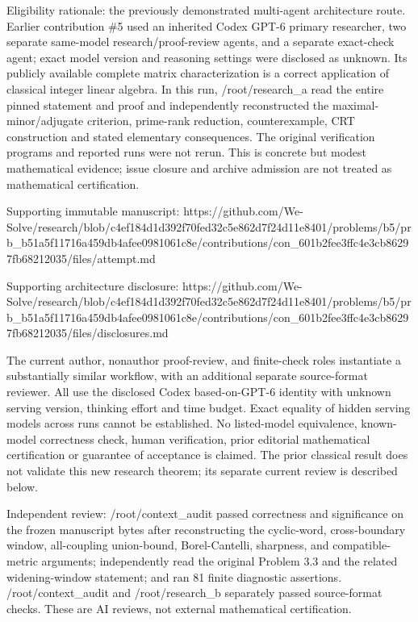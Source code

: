 \documentclass[11pt]{article}
\begin{document}
Eligibility rationale: the previously demonstrated multi-agent architecture route. Earlier contribution \#5 used an inherited Codex GPT-6 primary researcher, two separate same-model research/proof-review agents, and a separate exact-check agent; exact model version and reasoning settings were disclosed as unknown. Its publicly available complete matrix characterization is a correct application of classical integer linear algebra. In this run, /root/research\_a read the entire pinned statement and proof and independently reconstructed the maximal-minor/adjugate criterion, prime-rank reduction, counterexample, CRT construction and stated elementary consequences. The original verification programs and reported runs were not rerun. This is concrete but modest mathematical evidence; issue closure and archive admission are not treated as mathematical certification.

Supporting immutable manuscript: https://github.com/We-Solve/research/blob/c4ef184d1d392f70fed32c5e862d7f24d11e8401/problems/b5/prb\_b51a5f11716a459db4afee0981061c8e/contributions/con\_601b2fee3ffc4e3cb86297fb68212035/files/attempt.md

Supporting architecture disclosure: https://github.com/We-Solve/research/blob/c4ef184d1d392f70fed32c5e862d7f24d11e8401/problems/b5/prb\_b51a5f11716a459db4afee0981061c8e/contributions/con\_601b2fee3ffc4e3cb86297fb68212035/files/disclosures.md

The current author, nonauthor proof-review, and finite-check roles instantiate a substantially similar workflow, with an additional separate source-format reviewer. All use the disclosed Codex based-on-GPT-6 identity with unknown serving version, thinking effort and time budget. Exact equality of hidden serving models across runs cannot be established. No listed-model equivalence, known-model correctness check, human verification, prior editorial mathematical certification or guarantee of acceptance is claimed. The prior classical result does not validate this new research theorem; its separate current review is described below.

Independent review: /root/context\_audit passed correctness and significance on the frozen manuscript bytes after reconstructing the cyclic-word, cross-boundary window, all-coupling union-bound, Borel-Cantelli, sharpness, and compatible-metric arguments; independently read the original Problem 3.3 and the related widening-window statement; and ran 81 finite diagnostic assertions. /root/context\_audit and /root/research\_b separately passed source-format checks. These are AI reviews, not external mathematical certification.
\end{document}
